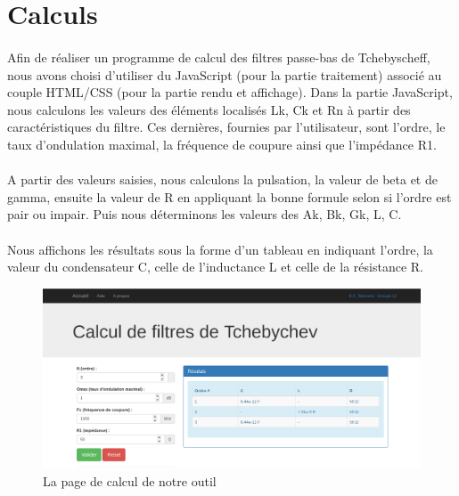 \documentclass[a4paper,11pt]{article}
\begin{document}
    \clearpage


\section{Calculs}
    \paragraph{}
Afin de réaliser un programme de calcul des filtres passe-bas de Tchebyscheff, nous avons choisi d’utiliser du JavaScript (pour la partie traitement) associé au couple HTML/CSS (pour la partie rendu et affichage).
Dans la partie JavaScript, nous calculons les valeurs des éléments localisés Lk, Ck et Rn à partir des caractéristiques du filtre.
Ces dernières, fournies par l'utilisateur, sont l’ordre, le taux d’ondulation maximal, la fréquence de coupure ainsi que l’impédance R1.
    \paragraph{}
A partir des valeurs saisies, nous calculons la pulsation, la valeur de beta et de gamma, ensuite la valeur de R en appliquant la bonne formule selon si l’ordre est pair ou impair.
Puis nous déterminons les valeurs des Ak, Bk, Gk, L, C.
    \paragraph{}
Nous affichons les résultats sous la forme d’un tableau en indiquant l’ordre, la valeur du condensateur C, celle de l’inductance L et celle de la résistance R.
    \\
    \begin{figure}[h]
        \begin{center}
            \includegraphics[scale=0.3]{images/filtres/screen-site.png}
        \end{center}
            \caption{ La page de calcul de notre outil }
            \label{La page de calcul de notre outil de calcul de filtres de Tchebyscheff}
    \end{figure}
\end{document}
